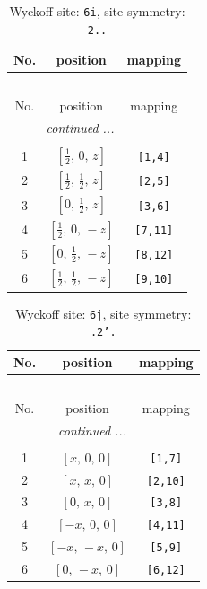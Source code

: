 \documentclass[fleqn,8pt]{jsarticle}
\begin{document}
\renewcommand{\arraystretch}{1.2}
\begin{longtable}{ccc}
\caption{Wyckoff site: {\tt 6i}, site symmetry: {\tt 2..}}
 \\
 \hline \hline
No. & position & mapping \\ \hline \endfirsthead

\multicolumn{2}{l}{\tablename\ \thetable{}} \\
 \hline \hline
No. & position & mapping \\ \hline \endhead

 \hline \hline
\multicolumn{2}{r}{\footnotesize\it continued ...} \\ \endfoot

 \hline \hline
\multicolumn{2}{r}{} \\ \endlastfoot

1 & $\left[ \frac{1}{2},\, 0,\, z \right]$ & {\tt [1,4]} \\ \hline
2 & $\left[ \frac{1}{2},\, \frac{1}{2},\, z \right]$ & {\tt [2,5]} \\ \hline
3 & $\left[ 0,\, \frac{1}{2},\, z \right]$ & {\tt [3,6]} \\ \hline
4 & $\left[ \frac{1}{2},\, 0,\, - z \right]$ & {\tt [7,11]} \\ \hline
5 & $\left[ 0,\, \frac{1}{2},\, - z \right]$ & {\tt [8,12]} \\ \hline
6 & $\left[ \frac{1}{2},\, \frac{1}{2},\, - z \right]$ & {\tt [9,10]} \\
\end{longtable}
\renewcommand{\arraystretch}{1.2}
\begin{longtable}{ccc}
\caption{Wyckoff site: {\tt 6j}, site symmetry: {\tt .2'.}}
 \\
 \hline \hline
No. & position & mapping \\ \hline \endfirsthead

\multicolumn{2}{l}{\tablename\ \thetable{}} \\
 \hline \hline
No. & position & mapping \\ \hline \endhead

 \hline \hline
\multicolumn{2}{r}{\footnotesize\it continued ...} \\ \endfoot

 \hline \hline
\multicolumn{2}{r}{} \\ \endlastfoot

1 & $\left[ x,\, 0,\, 0 \right]$ & {\tt [1,7]} \\ \hline
2 & $\left[ x,\, x,\, 0 \right]$ & {\tt [2,10]} \\ \hline
3 & $\left[ 0,\, x,\, 0 \right]$ & {\tt [3,8]} \\ \hline
4 & $\left[ - x,\, 0,\, 0 \right]$ & {\tt [4,11]} \\ \hline
5 & $\left[ - x,\, - x,\, 0 \right]$ & {\tt [5,9]} \\ \hline
6 & $\left[ 0,\, - x,\, 0 \right]$ & {\tt [6,12]} \\
\end{longtable}
\end{document}
